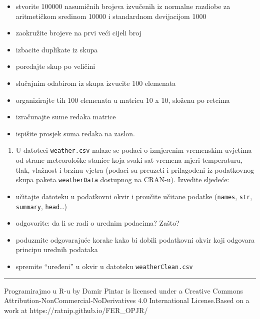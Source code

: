 \documentclass[]{book}
\providecommand{\tightlist}{%
  \setlength{\itemsep}{0pt}\setlength{\parskip}{0pt}}
\theoremstyle{definition}
\theoremstyle{definition}
\theoremstyle{definition}
\theoremstyle{remark}
\begin{document}
\begin{itemize}
\tightlist
\item
  stvorite 100000 nasumičnih brojeva izvučenih iz normalne razdiobe za
  aritmetičkom sredinom 10000 i standardnom devijacijom 1000
\item
  zaokružite brojeve na prvi veći cijeli broj
\item
  izbacite duplikate iz skupa
\item
  poredajte skup po veličini
\item
  slučajnim odabirom iz skupa izvucite 100 elemenata
\item
  organizirajte tih 100 elemenata u matricu 10 x 10, složenu po retcima
\item
  izračunajte sume redaka matrice
\item
  ispišite prosjek suma redaka na zaslon.
\end{itemize}

\begin{enumerate}
\def\labelenumi{\arabic{enumi}.}
\setcounter{enumi}{1}
\tightlist
\item
  U datoteci \texttt{weather.csv} nalaze se podaci o izmjerenim
  vremenskim uvjetima od strane meteorološke stanice koja svaki sat
  vremena mjeri temperaturu, tlak, vlažnost i brzinu vjetra (podaci su
  preuzeti i prilagođeni iz podatkovnog skupa paketa
  \texttt{weatherData} dostupnog na CRAN-u). Izvedite sljedeće:
\end{enumerate}

\begin{itemize}
\tightlist
\item
  učitajte datoteku u podatkovni okvir i proučite učitane podatke
  (\texttt{names}, \texttt{str}, \texttt{summary},
  \texttt{head}\ldots{})
\item
  odgovorite: da li se radi o urednim podacima? Zašto?
\item
  poduzmite odgovarajuće korake kako bi dobili podatkovni okvir koji
  odgovara principu urednih podataka
\item
  spremite ``uređeni'' u okvir u datoteku \texttt{weatherClean.csv}
\end{itemize}

\begin{center}\rule{0.5\linewidth}{\linethickness}\end{center}

{Programirajmo u R-u} by Damir Pintar is licensed under a Creative
Commons Attribution-NonCommercial-NoDerivatives 4.0 International
License.Based on a work at https://ratnip.github.io/FER\_OPJR/
\end{document}

